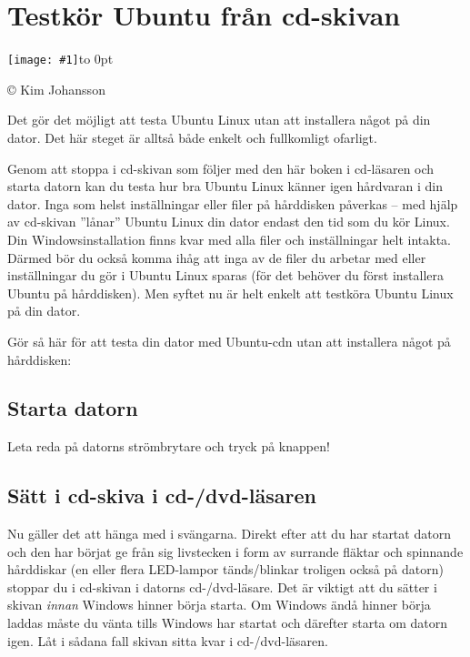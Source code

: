 \documentclass[a4paper,final]{memoir} %
\newcommand{\xrcredit}[1]{\hbox to 0pt{\hspace*{.6\baselineskip}\begin{rotate}{90}{\usefont{T1}{phv}{m}{n}\selectfont\tiny #1}\end{rotate}}}
\newcommand\xintropic[1]{{\texttt{[image: \#1]}\xrcredit{\copyright{} Kim Johansson}}\medskip}
\newcommand\xchapter[2]{\chapter{#2}\begin{center}\xintropic{#1}\end{center}}
\begin{document}

\xchapter{bilder804-all/Testkor_Ubuntu_fran_CD-skiva}{Testkör Ubuntu från cd-skivan}\label{cha:testkor}




Det gör det möjligt att testa Ubuntu Linux utan att installera något på din dator. Det här steget är alltså både enkelt och fullkomligt ofarligt. 

Genom att stoppa i cd-skivan som följer med den här boken i cd-läsaren och starta datorn kan du testa hur bra Ubuntu Linux känner igen hårdvaran i din dator. Inga som helst inställningar eller filer på hårddisken påverkas -- med hjälp av cd-skivan ''lånar'' Ubuntu Linux din dator endast den tid som du kör Linux. Din Windowsinstallation finns kvar med alla filer och inställningar helt intakta. Därmed bör du också komma ihåg att inga av de filer du arbetar med eller inställningar du gör i Ubuntu Linux sparas (för det behöver du först installera Ubuntu på hårddisken). Men syftet nu är helt enkelt att testköra Ubuntu Linux på din dator.

Gör så här för att testa din dator med Ubuntu-cdn utan att installera något på hårddisken:

\section{Starta datorn}

Leta reda på datorns strömbrytare och tryck på knappen! 

\section{Sätt i cd-skiva i cd-/dvd-läsaren}


Nu gäller det att hänga med i svängarna. Direkt efter att du har startat datorn och den har börjat ge från sig livstecken i form av surrande fläktar och spinnande hårddiskar (en eller flera LED-lampor tänds/blinkar troligen också på datorn) stoppar du i cd-skivan i datorns cd-/dvd-läsare. Det är viktigt att du sätter i skivan \textit{innan} Windows hinner börja starta. Om Windows ändå hinner börja laddas måste du vänta tills Windows har startat och därefter starta om datorn igen. Låt i sådana fall skivan sitta kvar i cd-/dvd-läsaren.
\end{document}
